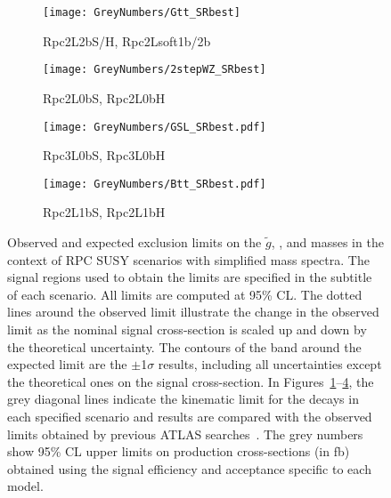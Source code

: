 \begin{figure}[p]
\centering
\begin{subfigure}[t]{0.49\textwidth}\texttt{[image: GreyNumbers/Gtt\_SRbest]}\caption{Rpc2L2bS/H, Rpc2Lsoft1b/2b}\label{fig:GN_limits_feynman_gtt}\end{subfigure}
\begin{subfigure}[t]{0.49\textwidth}\texttt{[image: GreyNumbers/2stepWZ\_SRbest]}\caption{Rpc2L0bS, Rpc2L0bH}\label{fig:GN_limits_feynman_gg2WZ}\end{subfigure}
\begin{subfigure}[t]{0.49\textwidth}\texttt{[image: GreyNumbers/GSL\_SRbest.pdf]}\caption{Rpc3L0bS, Rpc3L0bH}\label{fig:GN_limits_feynman_gg2sl}\end{subfigure}
\begin{subfigure}[t]{0.49\textwidth}\texttt{[image: GreyNumbers/Btt\_SRbest.pdf]}\caption{Rpc2L1bS, Rpc2L1bH}\label{fig:GN_limits_feynman_b1b1}\end{subfigure}

\caption{Observed and expected exclusion limits on the $\tilde{g}$, \sbottomone, \stopone and \ninoone masses 
in the context of RPC SUSY scenarios with simplified mass spectra. The signal regions used to obtain the limits are specified in the subtitle of each scenario. All limits are computed at 95\% CL. The dotted lines around the observed
limit illustrate the change in the observed limit as the nominal signal cross-section is scaled up and down
by the theoretical uncertainty. The contours of the band around the expected 
limit are the $\pm$1$\sigma$ results, 
including all uncertainties except the theoretical ones on the signal cross-section. In 
Figures~\ref{fig:GN_limits_feynman_gtt}--\ref{fig:GN_limits_feynman_b1b1}, the grey diagonal lines indicate the kinematic limit for the decays in each 
specified scenario and results are compared with the observed limits obtained by previous ATLAS searches~\cite{paperSS3L,Aad:2016jxj}. 
The grey numbers show 95\% CL upper limits on production cross-sections (in fb) obtained using the signal efficiency and acceptance specific to each model.}
\label{fig:Results_Limits_RPC_GN} 
\end{figure} 

\clearpage

